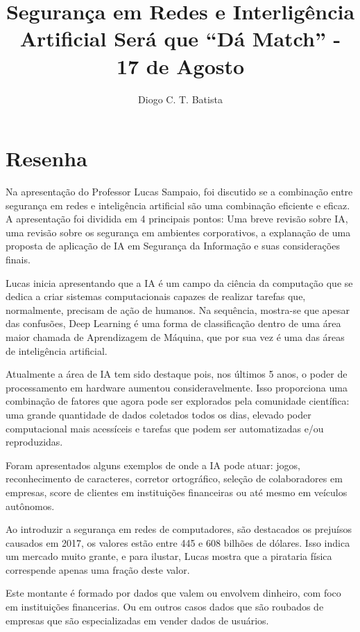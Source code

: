 \documentclass[12pt]{article}
\title{Segurança em Redes e Interligência Artificial Será que ``Dá Match'' - 17 de Agosto}
\author{Diogo C. T. Batista\inst{1}}
\begin{document}
\maketitle

\section{Resenha}

Na apresentação do Professor Lucas Sampaio, foi discutido se a combinação entre segurança em redes e inteligência artificial são uma combinação eficiente e eficaz. A apresentação foi dividida em 4 principais pontos: Uma breve revisão sobre IA, uma revisão sobre os segurança em ambientes corporativos, a explanação de uma proposta de aplicação de IA em Segurança da Informação e suas considerações finais.

Lucas inicia apresentando que a IA é um campo da ciência da computação que se dedica a criar sistemas computacionais capazes de realizar tarefas que, normalmente, precisam de ação de humanos. Na sequência, mostra-se que apesar das confusões, Deep Learning é uma forma de classificação dentro de uma área maior chamada de Aprendizagem de Máquina, que por sua vez é uma das áreas de inteligência artificial.

Atualmente a área de IA tem sido destaque pois, nos últimos 5 anos, o poder de processamento em hardware aumentou consideravelmente. Isso proporciona uma combinação de fatores que agora pode ser explorados pela comunidade científica: uma grande quantidade de dados coletados todos os dias, elevado poder computacional mais acessíceis e tarefas que podem ser automatizadas e/ou reproduzidas.

Foram apresentados alguns exemplos de onde a IA pode atuar: jogos, reconhecimento de caracteres, corretor ortográfico, seleção de colaboradores em empresas, score de clientes em instituições financeiras ou até mesmo em veículos autônomos.

Ao introduzir a segurança em redes de computadores, são destacados os prejuísos causados em 2017, os valores estão entre 445 e 608 bilhões de dólares. Isso indica um mercado muito grante, e para ilustar, Lucas mostra que a pirataria física correspende apenas uma fração deste valor.

Este montante é formado por dados que valem ou envolvem dinheiro, com foco em instituições financerias. Ou em outros casos dados que são roubados de empresas que são especializadas em vender dados de usuários.
\end{document}
